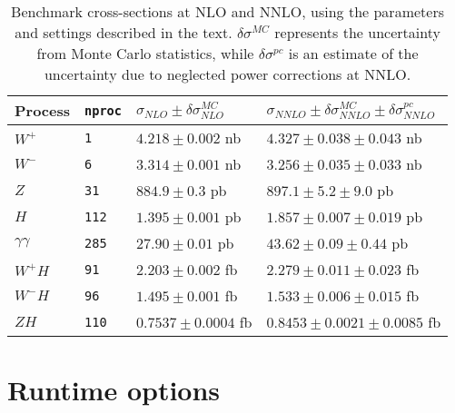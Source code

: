 \documentclass[12pt]{article}
\begin{document}
\begin{table}
\begin{center}
\begin{tabular}{|l|l|l|l|} \hline
Process & {\tt nproc} & $\sigma_{NLO} \pm \delta\sigma_{NLO}^{MC} $ & $\sigma_{NNLO} \pm \delta\sigma_{NNLO}^{MC} \pm \delta\sigma_{NNLO}^{pc}$ \\ 
\hline
$W^+$ & {\tt 1}    & $4.218 \pm 0.002$ nb & $4.327 \pm 0.038 \pm 0.043$ nb\\
$W^-$ & {\tt 6}    & $3.314 \pm 0.001$ nb & $3.256 \pm 0.035 \pm 0.033$ nb\\
$Z  $ & {\tt 31}   & $884.9 \pm 0.3$ pb & $897.1 \pm 5.2 \pm 9.0$ pb\\
$H  $ & {\tt 112}  & $1.395 \pm 0.001$ pb & $1.857 \pm 0.007 \pm 0.019$ pb\\
$\gamma\gamma  $ & {\tt 285}  & $27.90 \pm 0.01$ pb & $43.62 \pm 0.09 \pm 0.44$ pb\\
$W^+H$ & {\tt 91}    & $2.203 \pm 0.002$ fb & $2.279 \pm 0.011 \pm 0.023$ fb\\
$W^-H$ & {\tt 96}    & $1.495 \pm 0.001$ fb & $1.533 \pm 0.006 \pm 0.015$ fb\\
$ZH$   & {\tt 110}   & $0.7537 \pm 0.0004$ fb & $0.8453 \pm 0.0021 \pm 0.0085$ fb\\
\hline
\end{tabular}
\caption{Benchmark cross-sections at NLO and NNLO, using the parameters
and settings described in the text.  $\delta\sigma^{MC}$ represents the uncertainty
from Monte Carlo statistics, while $\delta\sigma^{pc}$ is an estimate of the
uncertainty due to neglected power corrections at NNLO.}
\label{NNLObenchmarks} 
\end{center}
\end{table}

\section{Runtime options}
\end{document}
